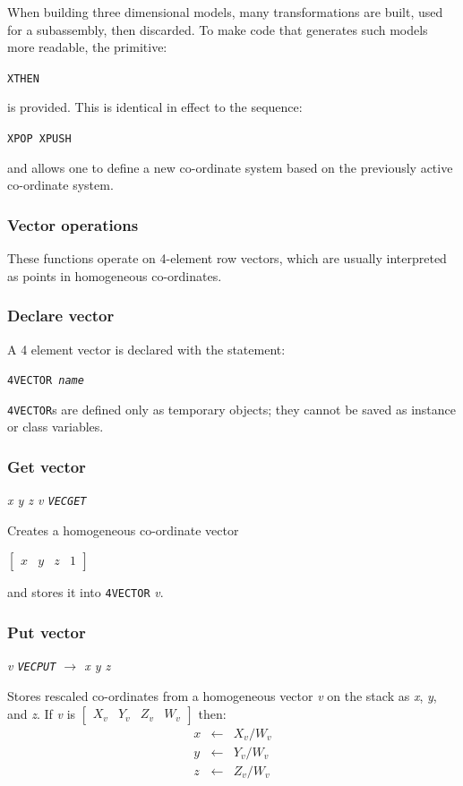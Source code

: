 \documentclass{article}
\begin{document}
When building three dimensional models, many transformations are
built, used for a subassembly, then discarded.  To make code
that generates such models more readable, the primitive:

{\tt XTHEN}

is provided.  This is identical in effect to the sequence:

{\tt XPOP XPUSH}

and allows one to define a new co-ordinate system based on
the previously active co-ordinate system.

\subsubsection{Vector operations}

These functions operate on 4-element row vectors, which are usually
interpreted as points in homogeneous co-ordinates.

\subsubsection{Declare vector}

A 4 element vector is declared with the statement:

{\tt 4VECTOR {\em name}}

{\tt 4VECTOR}s are defined only as temporary objects; they cannot be
saved as instance or class variables.

\subsubsection{Get vector}

{\em x y z v {\tt VECGET}}

Creates a homogeneous co-ordinate vector\\
\centerline{$[\begin{array}{cccc} \mathit{x} & \mathit{y} & \mathit{z} & 1
\end{array}]$}
and stores it into {\tt 4VECTOR} {\em v}.

\subsubsection{Put vector}

{\em v {\tt VECPUT} $\rightarrow$ x y z}

Stores rescaled co-ordinates from a homogeneous vector {\em v} on the
stack as
{\em x}, {\em y}, and {\em z}.  If {\em v} is
$[ \begin{array}{cccc} X_{v} & Y_{v} & Z_{v} & W_{v}\end{array} ]$
then:
\begin{eqnarray*}
\mathit{x} & \leftarrow & X_{v}/W_{v} \\
\mathit{y} & \leftarrow & Y_{v}/W_{v} \\
\mathit{z} & \leftarrow & Z_{v}/W_{v}
\end{eqnarray*}
\end{document}

